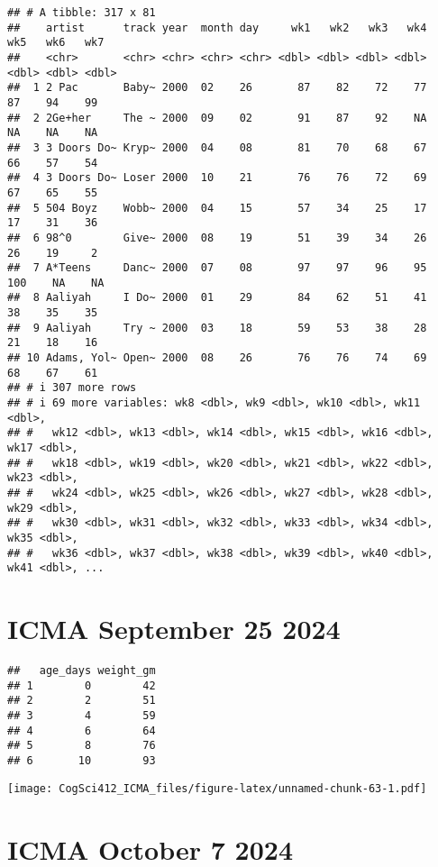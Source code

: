 \documentclass[
]{article}
\begin{document}
\begin{verbatim}
## # A tibble: 317 x 81
##    artist      track year  month day     wk1   wk2   wk3   wk4   wk5   wk6   wk7
##    <chr>       <chr> <chr> <chr> <chr> <dbl> <dbl> <dbl> <dbl> <dbl> <dbl> <dbl>
##  1 2 Pac       Baby~ 2000  02    26       87    82    72    77    87    94    99
##  2 2Ge+her     The ~ 2000  09    02       91    87    92    NA    NA    NA    NA
##  3 3 Doors Do~ Kryp~ 2000  04    08       81    70    68    67    66    57    54
##  4 3 Doors Do~ Loser 2000  10    21       76    76    72    69    67    65    55
##  5 504 Boyz    Wobb~ 2000  04    15       57    34    25    17    17    31    36
##  6 98^0        Give~ 2000  08    19       51    39    34    26    26    19     2
##  7 A*Teens     Danc~ 2000  07    08       97    97    96    95   100    NA    NA
##  8 Aaliyah     I Do~ 2000  01    29       84    62    51    41    38    35    35
##  9 Aaliyah     Try ~ 2000  03    18       59    53    38    28    21    18    16
## 10 Adams, Yol~ Open~ 2000  08    26       76    76    74    69    68    67    61
## # i 307 more rows
## # i 69 more variables: wk8 <dbl>, wk9 <dbl>, wk10 <dbl>, wk11 <dbl>,
## #   wk12 <dbl>, wk13 <dbl>, wk14 <dbl>, wk15 <dbl>, wk16 <dbl>, wk17 <dbl>,
## #   wk18 <dbl>, wk19 <dbl>, wk20 <dbl>, wk21 <dbl>, wk22 <dbl>, wk23 <dbl>,
## #   wk24 <dbl>, wk25 <dbl>, wk26 <dbl>, wk27 <dbl>, wk28 <dbl>, wk29 <dbl>,
## #   wk30 <dbl>, wk31 <dbl>, wk32 <dbl>, wk33 <dbl>, wk34 <dbl>, wk35 <dbl>,
## #   wk36 <dbl>, wk37 <dbl>, wk38 <dbl>, wk39 <dbl>, wk40 <dbl>, wk41 <dbl>, ...
\end{verbatim}

\section{ICMA September 25 2024}\label{icma-september-25-2024}

\begin{verbatim}
##   age_days weight_gm
## 1        0        42
## 2        2        51
## 3        4        59
## 4        6        64
## 5        8        76
## 6       10        93
\end{verbatim}

\texttt{[image: CogSci412\_ICMA\_files/figure-latex/unnamed-chunk-63-1.pdf]}

\section{ICMA October 7 2024}\label{icma-october-7-2024}
\end{document}
